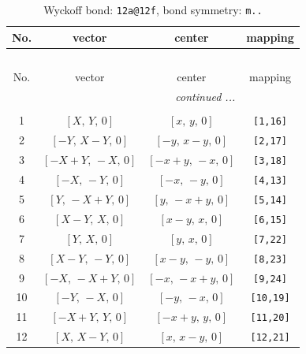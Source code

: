 \documentclass[fleqn,8pt]{jsarticle}
\begin{document}
\begin{longtable}{cccc}
\caption{Wyckoff bond: {\tt 12a@12f}, bond symmetry: {\tt m..}}
 \\
 \hline \hline
No. & vector & center & mapping \\ \hline \endfirsthead

\multicolumn{3}{l}{\tablename\ \thetable{}} \\
 \hline \hline
No. & vector & center & mapping \\ \hline \endhead

 \hline \hline
\multicolumn{3}{r}{\footnotesize\it continued ...} \\ \endfoot

 \hline \hline
\multicolumn{3}{r}{} \\ \endlastfoot

1 & $\left[ X,\, Y,\, 0 \right]$ & $\left[ x,\, y,\, 0 \right]$ & {\tt [1,16]} \\ \hline
2 & $\left[ - Y,\, X - Y,\, 0 \right]$ & $\left[ - y,\, x - y,\, 0 \right]$ & {\tt [2,17]} \\ \hline
3 & $\left[ - X + Y,\, - X,\, 0 \right]$ & $\left[ - x + y,\, - x,\, 0 \right]$ & {\tt [3,18]} \\ \hline
4 & $\left[ - X,\, - Y,\, 0 \right]$ & $\left[ - x,\, - y,\, 0 \right]$ & {\tt [4,13]} \\ \hline
5 & $\left[ Y,\, - X + Y,\, 0 \right]$ & $\left[ y,\, - x + y,\, 0 \right]$ & {\tt [5,14]} \\ \hline
6 & $\left[ X - Y,\, X,\, 0 \right]$ & $\left[ x - y,\, x,\, 0 \right]$ & {\tt [6,15]} \\ \hline
7 & $\left[ Y,\, X,\, 0 \right]$ & $\left[ y,\, x,\, 0 \right]$ & {\tt [7,22]} \\ \hline
8 & $\left[ X - Y,\, - Y,\, 0 \right]$ & $\left[ x - y,\, - y,\, 0 \right]$ & {\tt [8,23]} \\ \hline
9 & $\left[ - X,\, - X + Y,\, 0 \right]$ & $\left[ - x,\, - x + y,\, 0 \right]$ & {\tt [9,24]} \\ \hline
10 & $\left[ - Y,\, - X,\, 0 \right]$ & $\left[ - y,\, - x,\, 0 \right]$ & {\tt [10,19]} \\ \hline
11 & $\left[ - X + Y,\, Y,\, 0 \right]$ & $\left[ - x + y,\, y,\, 0 \right]$ & {\tt [11,20]} \\ \hline
12 & $\left[ X,\, X - Y,\, 0 \right]$ & $\left[ x,\, x - y,\, 0 \right]$ & {\tt [12,21]} \\
\end{longtable}
\renewcommand{\arraystretch}{1.2}
\end{document}
